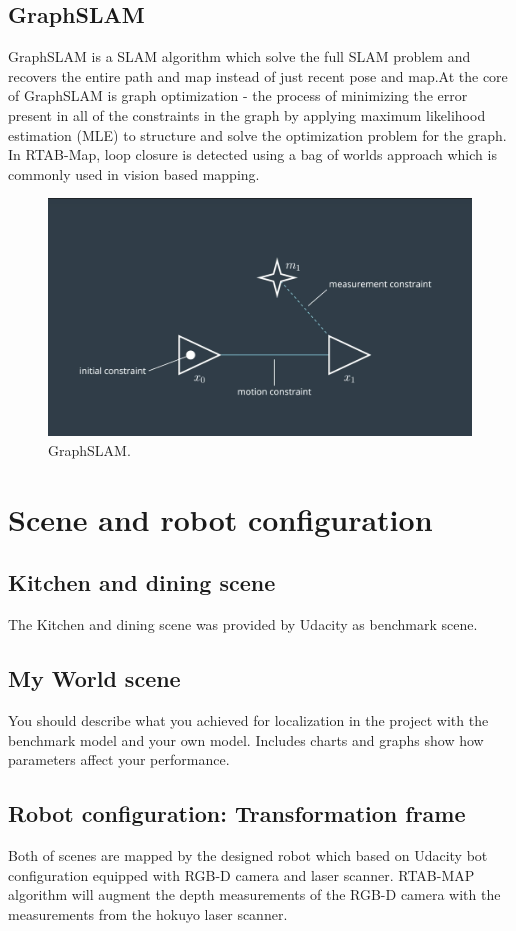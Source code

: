 \documentclass[10pt,journal,compsoc]{IEEEtran}
\begin{document}
\subsection{GraphSLAM}
GraphSLAM is a SLAM algorithm which solve the full SLAM problem and recovers the entire path and map instead of just recent pose and map.At the core of GraphSLAM is graph optimization - the process of minimizing the error present in all of the constraints in the graph by applying maximum likelihood estimation (MLE) to structure and solve the optimization problem for the graph.
In RTAB-Map, loop closure is detected using a bag of worlds approach which is commonly used in vision based mapping.
\begin{figure}[thpb]
      \centering
      \includegraphics[width=\linewidth]{GraphSLAM.png}
      \caption{GraphSLAM.}
      \label{fig:robot1}
\end{figure}

\section{Scene and robot configuration}

\subsection{Kitchen and dining scene}
The Kitchen and dining scene was provided by Udacity as benchmark scene.
\subsection{My World scene}
You should describe what you achieved for localization in the project with the benchmark model and your own model. Includes charts and graphs show how parameters affect your performance. 
\subsection{Robot configuration: Transformation frame}
Both of scenes are mapped by the designed robot which based on Udacity bot configuration equipped with RGB-D camera and laser scanner. RTAB-MAP algorithm will augment the depth measurements of the RGB-D camera with the measurements from the hokuyo laser scanner.
\end{document}
